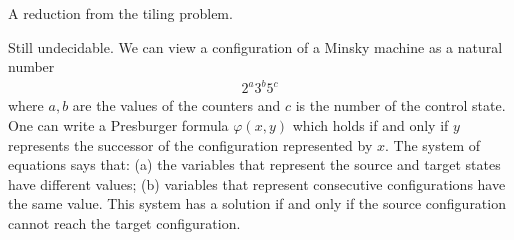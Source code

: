 
 

\exercisepart
{}
{
 A reduction from the tiling problem.
}

{Still undecidable.
We can view a configuration of a Minsky machine as a natural number
\begin{align*}2^a 3^b 5^c
\end{align*}
where $a,b$ are the values of the counters and $c$ is the number of the control state. One can write a Presburger formula $\varphi(x,y)$ which holds if and only if $y$ represents the successor of the configuration represented by $x$. The system of equations says that: (a) the variables that represent the source and target states have different values; (b) variables that represent consecutive configurations have the same value. This system has a solution if and only if the source configuration cannot reach the target configuration. 
}

